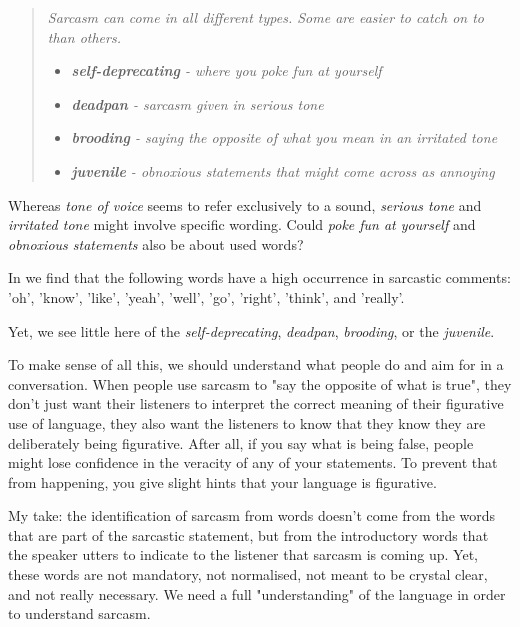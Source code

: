 \documentclass[11pt,a4paper]{article}
\begin{document}
\begin{quotation}
\textit{Sarcasm can come in all different types.  Some are easier to catch on to than others.}
\begin{itemize}
\item{\textit{\textbf{self-deprecating} - where you poke fun at yourself}}
\item{\textit{\textbf{deadpan} - sarcasm given in serious tone}}
\item{\textit{\textbf{brooding} - saying the opposite of what you mean in an irritated tone}}
\item{\textit{\textbf{juvenile} - obnoxious statements that might come across as annoying}}
\end{itemize}
\end{quotation}
 
Whereas \textit{tone of voice} seems to refer exclusively to a sound, \textit{serious tone} and \textit{irritated tone} might involve specific wording. Could \textit{poke fun at yourself} and \textit{obnoxious statements} also be about used words?\par 

In \cite{10.1007/978-981-16-1543-6_6} we find that the following words have a high occurrence in sarcastic comments: 'oh', 'know', 'like', 'yeah', 'well', 'go', 'right', 'think', and 'really'.\par 

Yet, we see little here of the \textit{self-deprecating}, \textit{deadpan}, \textit{brooding}, or the \textit{juvenile}. \par 

To make sense of all this, we should understand what people do and aim for in a conversation.  When people use sarcasm to "say the opposite of what is true",  they don't just want their listeners to interpret the correct meaning of their figurative use of language, they also want the listeners to know that they know they are deliberately being figurative.  After all, if you say what is being false, people might lose confidence in the veracity of any of your statements. To prevent that from happening, you give slight hints that your language is figurative. \par 

My take: the identification of sarcasm from words doesn't come from the words that are part of the sarcastic statement, but from the introductory words that the speaker utters to indicate to the listener that sarcasm is coming up. Yet, these words are not mandatory, not normalised, not meant to be crystal clear, and not really necessary.  We need a full "understanding" of the language in order to understand sarcasm.\par 
\end{document}
